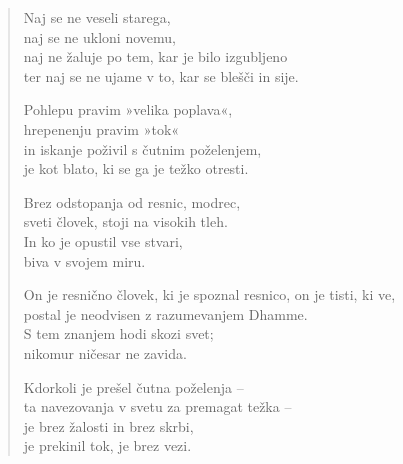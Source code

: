\clearpage
\begin{verse}

Naj se ne veseli starega,\\
naj se ne ukloni novemu,\\
naj ne žaluje po tem, kar je bilo izgubljeno\\
ter naj se ne ujame v to, kar se blešči in sije.

Pohlepu pravim »velika poplava«,\\
hrepenenju pravim »tok«\\
in iskanje poživil s čutnim poželenjem,\\
je kot blato, ki se ga je težko otresti.

Brez odstopanja od resnic, modrec,\\
sveti človek, stoji na visokih tleh.\\
In ko je opustil vse stvari,\\
biva v svojem miru.

On je resnično človek, ki je spoznal resnico, on je tisti, ki ve,\\
postal je neodvisen z razumevanjem Dhamme.\\
S tem znanjem hodi skozi svet;\\
nikomur ničesar ne zavida.

Kdorkoli je prešel čutna poželenja --\\
ta navezovanja v svetu za premagat težka --\\
je brez žalosti in brez skrbi,\\
je prekinil tok, je brez vezi.

\end{verse}


